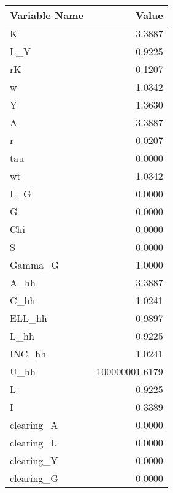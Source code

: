 \begin{tabular}{l r}
\hline
Variable Name & Value \\
\hline
K & 3.3887 \\
L_Y & 0.9225 \\
rK & 0.1207 \\
w & 1.0342 \\
Y & 1.3630 \\
A & 3.3887 \\
r & 0.0207 \\
tau & 0.0000 \\
wt & 1.0342 \\
L_G & 0.0000 \\
G & 0.0000 \\
Chi & 0.0000 \\
S & 0.0000 \\
Gamma_G & 1.0000 \\
A_hh & 3.3887 \\
C_hh & 1.0241 \\
ELL_hh & 0.9897 \\
L_hh & 0.9225 \\
INC_hh & 1.0241 \\
U_hh & -100000001.6179 \\
L & 0.9225 \\
I & 0.3389 \\
clearing_A & 0.0000 \\
clearing_L & 0.0000 \\
clearing_Y & 0.0000 \\
clearing_G & 0.0000 \\
\hline
\end{tabular}
